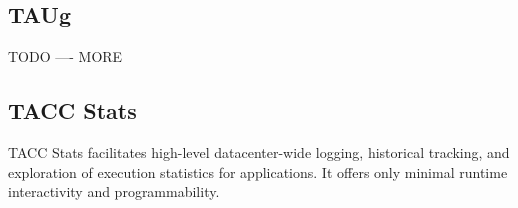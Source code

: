 \subsection{TAUg} %
%
TODO ---- MORE
%
\subsection{TACC Stats} %
%
TACC Stats \cite{evans2014comprehensive} facilitates high-level
datacenter-wide logging, historical tracking, and exploration of
execution statistics for applications.  It offers only minimal
runtime interactivity and programmability.
%



